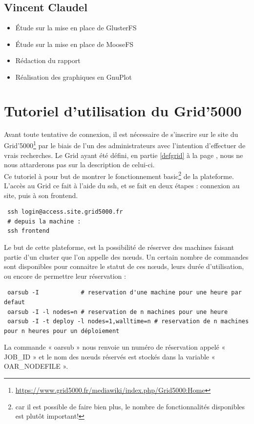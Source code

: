 \documentclass[12pt]{report}
\begin{document}
				\subsection{Vincent Claudel}
					\begin{itemize}
						\item Étude sur la mise en place de GlusterFS
						\item Étude sur la mise en place de MooseFS
						\item Rédaction du rapport
						\item Réalisation des graphiques en GnuPlot
					\end{itemize}
		  \section{Tutoriel d'utilisation du Grid'5000}
		  \label{grid}
		  Avant toute tentative de connexion, il est nécessaire de s'inscrire sur le site du Grid'5000\footnote{\href{https://www.grid5000.fr/mediawiki/index.php/Grid5000:Home}{https://www.grid5000.fr/mediawiki/index.php/Grid5000:Home}} par le biais de l'un des administrateurs avec l'intention d'effectuer de vrais recherches. Le Grid ayant été défini, en partie \ref{defgrid} à la page \pageref{defgrid}, nous ne nous attarderons pas sur la description de celui-ci.\\
		  Ce tutoriel à pour but de montrer le fonctionnement basic\footnote{car il est possible de faire bien plus, le nombre de fonctionnalités disponibles est plutôt important!} de la plateforme.\\
		  L'accès au Grid ce fait à l'aide du ssh, et se fait en deux étapes : connexion au site, puis à son frontend.
		  \begin{lstlisting}
 ssh login@access.site.grid5000.fr
 # depuis la machine :
 ssh frontend
      \end{lstlisting}
      Le but de cette plateforme, est la possibilité de réserver des machines faisant partie d'un cluster que l'on appelle des nœuds. Un certain nombre de commandes sont disponibles pour connaitre le statut de ces nœuds, leurs durée d'utilisation, ou encore de permettre leur réservation :
		  \begin{lstlisting}
 oarsub -I            # reservation d'une machine pour une heure par defaut
 oarsub -I -l nodes=n # reservation de n machines pour une heure
 oarsub -I -t deploy -l nodes=1,walltime=n # reservation de n machines pour n heures pour un déploiement
      \end{lstlisting}
      La commande « oarsub » nous renvoie un numéro de réservation appelé « JOB\_ID » et le nom des nœuds réservés est stockés dans la variable « OAR\_NODEFILE ».
\end{document}
